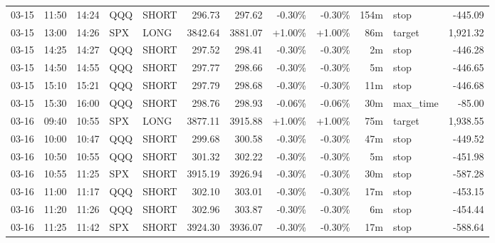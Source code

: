 \documentclass[11pt,a4paper,twoside]{article}
\begin{document}
\begin{center}
\begin{longtable}{>{\color{txtmain}}l l l l l r r r r r >{\color{txtmain}}l r}
03-15 & 11:50 & 14:24 & QQQ & SHORT & 296.73 & 297.62 & \textcolor{lossred}{-0.30\%} & \textcolor{lossred}{-0.30\%} & 154m & stop & \textcolor{lossred}{-445.09} \\
03-15 & 13:00 & 14:26 & SPX & LONG & 3842.64 & 3881.07 & \textcolor{wingreen}{+1.00\%} & \textcolor{wingreen}{+1.00\%} & 86m & target & \textcolor{wingreen}{1,921.32} \\
03-15 & 14:25 & 14:27 & QQQ & SHORT & 297.52 & 298.41 & \textcolor{lossred}{-0.30\%} & \textcolor{lossred}{-0.30\%} & 2m & stop & \textcolor{lossred}{-446.28} \\
03-15 & 14:50 & 14:55 & QQQ & SHORT & 297.77 & 298.66 & \textcolor{lossred}{-0.30\%} & \textcolor{lossred}{-0.30\%} & 5m & stop & \textcolor{lossred}{-446.65} \\
03-15 & 15:10 & 15:21 & QQQ & SHORT & 297.79 & 298.68 & \textcolor{lossred}{-0.30\%} & \textcolor{lossred}{-0.30\%} & 11m & stop & \textcolor{lossred}{-446.68} \\
03-15 & 15:30 & 16:00 & QQQ & SHORT & 298.76 & 298.93 & \textcolor{lossred}{-0.06\%} & \textcolor{lossred}{-0.06\%} & 30m & max\_time & \textcolor{lossred}{-85.00} \\
03-16 & 09:40 & 10:55 & SPX & LONG & 3877.11 & 3915.88 & \textcolor{wingreen}{+1.00\%} & \textcolor{wingreen}{+1.00\%} & 75m & target & \textcolor{wingreen}{1,938.55} \\
03-16 & 10:00 & 10:47 & QQQ & SHORT & 299.68 & 300.58 & \textcolor{lossred}{-0.30\%} & \textcolor{lossred}{-0.30\%} & 47m & stop & \textcolor{lossred}{-449.52} \\
03-16 & 10:50 & 10:55 & QQQ & SHORT & 301.32 & 302.22 & \textcolor{lossred}{-0.30\%} & \textcolor{lossred}{-0.30\%} & 5m & stop & \textcolor{lossred}{-451.98} \\
03-16 & 10:55 & 11:25 & SPX & SHORT & 3915.19 & 3926.94 & \textcolor{lossred}{-0.30\%} & \textcolor{lossred}{-0.30\%} & 30m & stop & \textcolor{lossred}{-587.28} \\
03-16 & 11:00 & 11:17 & QQQ & SHORT & 302.10 & 303.01 & \textcolor{lossred}{-0.30\%} & \textcolor{lossred}{-0.30\%} & 17m & stop & \textcolor{lossred}{-453.15} \\
03-16 & 11:20 & 11:26 & QQQ & SHORT & 302.96 & 303.87 & \textcolor{lossred}{-0.30\%} & \textcolor{lossred}{-0.30\%} & 6m & stop & \textcolor{lossred}{-454.44} \\
03-16 & 11:25 & 11:42 & SPX & SHORT & 3924.30 & 3936.07 & \textcolor{lossred}{-0.30\%} & \textcolor{lossred}{-0.30\%} & 17m & stop & \textcolor{lossred}{-588.64} \\

\end{longtable}
\end{center}
\end{document}
